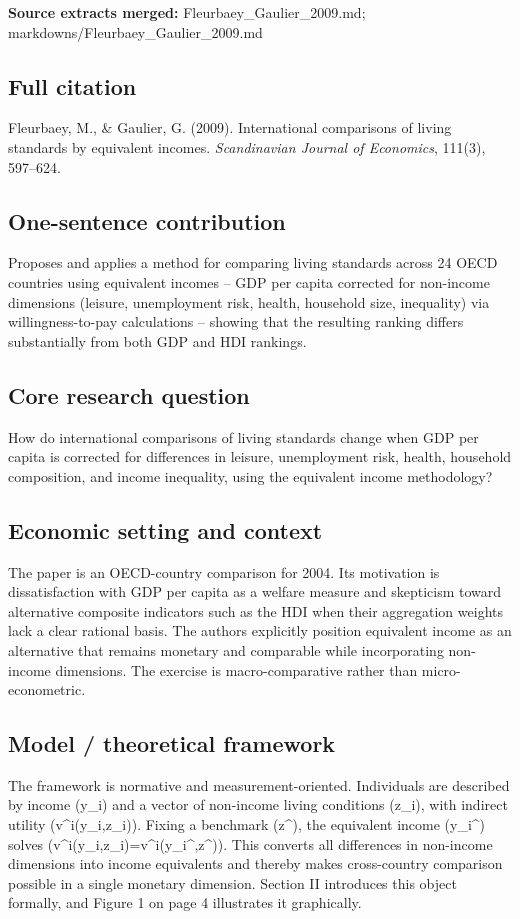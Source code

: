 \documentclass[11pt,a4paper]{article}
\begin{document}
\textbf{Source extracts merged:} Fleurbaey\_Gaulier\_2009.md; markdowns/Fleurbaey\_Gaulier\_2009.md

\subsection*{Full citation}
Fleurbaey, M., \& Gaulier, G. (2009). International comparisons of living standards by equivalent incomes. \textit{Scandinavian Journal of Economics}, 111(3), 597--624.

\subsection*{One-sentence contribution}
Proposes and applies a method for comparing living standards across 24 OECD countries using equivalent incomes -- GDP per capita corrected for non-income dimensions (leisure, unemployment risk, health, household size, inequality) via willingness-to-pay calculations -- showing that the resulting ranking differs substantially from both GDP and HDI rankings.

\subsection*{Core research question}
How do international comparisons of living standards change when GDP per capita is corrected for differences in leisure, unemployment risk, health, household composition, and income inequality, using the equivalent income methodology?

\subsection*{Economic setting and context}
The paper is an OECD-country comparison for 2004. Its motivation is dissatisfaction with GDP per capita as a welfare measure and skepticism toward alternative composite indicators such as the HDI when their aggregation weights lack a clear rational basis. The authors explicitly position equivalent income as an alternative that remains monetary and comparable while incorporating non-income dimensions. The exercise is macro-comparative rather than micro-econometric.

\subsection*{Model / theoretical framework}
The framework is normative and measurement-oriented. Individuals are described by income (y\_i) and a vector of non-income living conditions (z\_i), with indirect utility (v\textasciicircum{}i(y\_i,z\_i)). Fixing a benchmark (z\textasciicircum{}), the equivalent income (y\_i\textasciicircum{}) solves (v\textasciicircum{}i(y\_i,z\_i)=v\textasciicircum{}i(y\_i\textasciicircum{},z\textasciicircum{})). This converts all differences in non-income dimensions into income equivalents and thereby makes cross-country comparison possible in a single monetary dimension. Section II introduces this object formally, and Figure 1 on page 4 illustrates it graphically.
\end{document}
